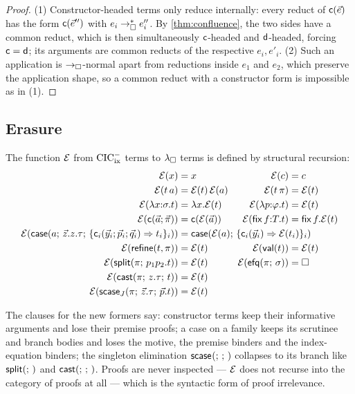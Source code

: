 \begin{proof}
(1) Constructor-headed terms only reduce internally: every reduct of
$\mathsf{c}(\vec{e})$ has the form $\mathsf{c}(\vec{e}'')$ with $e_i \rightarrow_{\square}^{*}
e''_i$.  By \cref{thm:confluence}, the two sides have a common reduct,
which is then simultaneously $\mathsf{c}$-headed and $\mathsf{d}$-headed,
forcing $\mathsf{c} = \mathsf{d}$; its arguments are common reducts of the
respective $e_i, e'_i$.
(2) Such an application is $\rightarrow_{\square}$-normal apart from reductions inside
$e_1$ and $e_2$, which preserve the application shape, so a common
reduct with a constructor form is impossible as in (1).
\end{proof}

\subsection{Erasure}

\begin{definition}[Erasure]
\label{def:erasure}
The function $\mathcal{E}$ from $\mathrm{CIC}^{-}_{\mathrm{ix}}$ terms to $\lambda_{\square}$ terms is defined by
structural recursion:
\begin{align*}
  \erase{x} &= x
  & \erase{c} &= c
  \\
  \erase{t\,a} &= \erase{t}\,\erase{a}
  & \erase{t\,\pi} &= \erase{t}
  \\
  \erase{\lambda x{:}\sigma.t} &= \lambda x.\erase{t}
  & \erase{\lambda p{:}\varphi.t} &= \erase{t}
  \\
  \erase{\wcns{c}(\tup{a};\tup{\pi})} &= \wcns{c}(\erase{\tup{a}})
  & \erase{\tfix\,f{:}T.t} &= \mathsf{fix}\,f.\erase{t}
  \\
  \erase{\tcase{a}{\tup{z}.z.\tau}{\{\wcns{c}_i(\tup{y}_i;\tup{p}_i;\tup{q}_i)
    \Rightarrow t_i\}_i}}
    &\mathrlap{{}= \mathsf{case}(\erase{a};\,
       \{\wcns{c}_i(\tup{y}_i) \Rightarrow \erase{t_i}\}_i)}
  \\
  \erase{\trefine{t}{\pi}} &= \erase{t}
  & \erase{\tval{t}} &= \erase{t}
  \\
  \erase{\tsplit{\pi}{p_1 p_2.t}} &= \erase{t}
  & \erase{\texfalso{\pi}{\sigma}} &= \bx
  \\
  \erase{\tcast{\pi}{z.\tau}{t}} &= \erase{t}
  \\
  \erase{\tscase{J}{\pi}{\tup{z}.\tau}{\tup{p}.t}}
    &\mathrlap{{}= \erase{t}}
\end{align*}
\end{definition}

The clauses for the new formers say: constructor terms keep their
informative arguments and lose their premise proofs; a case on a family
keeps its scrutinee and branch bodies and loses the motive, the premise
binders and the index-equation binders; the singleton elimination
$\mathsf{scase}_{}(;\,;\,)$ collapses to its branch like $\mathsf{split}(;\,)$ and
$\mathsf{cast}(;\,;\,)$.  Proofs are never inspected --- $\mathcal{E}$ does not
recurse into the category of proofs at all --- which is the syntactic
form of proof irrelevance.

